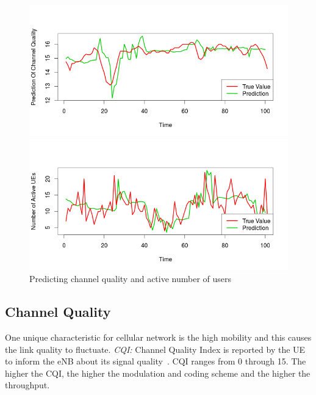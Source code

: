 
\begin{figure}[t]

\begin{minipage} {\linewidth}
\centering
 \includegraphics[width=\linewidth]{pictures/prediction.png}
\end{minipage}
\hspace{0.5cm}
\begin{minipage} {\linewidth}
\centering
 \includegraphics[width=\linewidth]{pictures/UE.png}
\end{minipage}

\caption{Predicting channel quality and active number of users} \label{fig:prediction}
\end{figure}

\subsection{Channel Quality}\label{subsec:CQ}
One unique characteristic for cellular network is the high mobility and this causes the link quality to fluctuate. 
\emph{CQI:} Channel Quality Index is reported by the UE to inform the eNB about its signal quality~\cite{cqi}.  CQI ranges from 0 through 15. The higher the CQI, the higher the modulation and coding scheme and the higher the throughput. 

